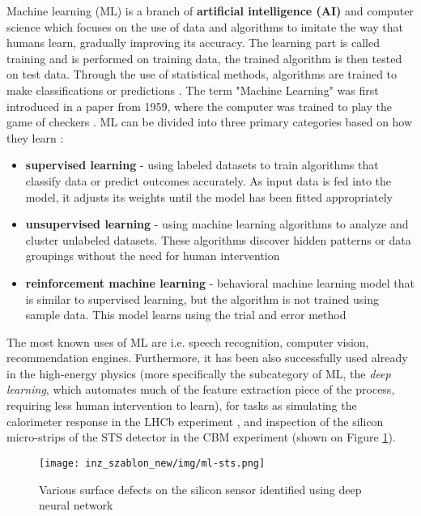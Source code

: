 \pagestyle{fancy}
Machine learning (ML) is a branch of \textbf{artificial intelligence (AI)} and computer science which focuses on the use of data and algorithms to imitate the way that humans learn, gradually improving its accuracy. 
The learning part is called training and is performed on training data, the trained algorithm is then tested on test data. 
Through the use of statistical methods, algorithms are trained to make classifications or predictions \cite{ibm}. The term "Machine Learning" was first introduced in a paper from 1959, where the computer was trained to play the game of checkers \cite{ml0}. ML can be divided into three primary categories based on how they learn \cite{ibm}:
\begin{itemize}\thispagestyle{fancy}
    \item \textbf{supervised learning} - using labeled datasets to train algorithms that classify data or predict outcomes accurately. As input data is fed into the model, it adjusts its weights until the model has been fitted appropriately
    \item \textbf{unsupervised learning} - using machine learning algorithms to analyze and cluster unlabeled datasets. These algorithms discover hidden patterns or data groupings without the need for human intervention
    \item \textbf{reinforcement machine learning} -  behavioral machine learning model that is similar to supervised learning, but the algorithm is not trained using sample data. This model learns using the trial and error method
    \end{itemize}
The most known uses of ML are i.e. speech recognition, computer vision, recommendation engines. Furthermore, it has been also successfully used already in the high-energy physics (more specifically the subcategory of ML, the \emph{deep learning}, which automates much of the feature extraction piece of the process, requiring less human intervention to learn), for tasks as simulating the calorimeter response in the LHCb experiment \cite{lhcb}, and inspection of the silicon micro-strips of the STS detector in the CBM experiment \cite{zenia} (shown on Figure \ref{zenia ml}).
\begin{figure}[H]
    \centering
    \texttt{[image: inz\_szablon\_new/img/ml-sts.png]}
    \caption{Various surface defects on the silicon sensor identified using deep neural network \cite{zenia}}
    \label{zenia ml}
\end{figure}


